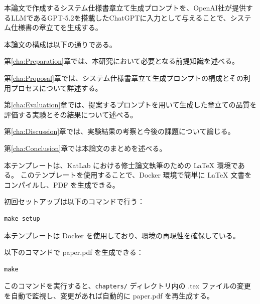 本論文で作成するシステム仕様書章立て生成プロンプトを、OpenAI\cite{openai}社が提供するLLMであるGPT-5.2\cite{gpt52}を搭載したChatGPT\cite{chatgpt}に入力として与えることで、システム仕様書の章立てを生成する。


本論文の構成は以下の通りである。

第\ref{cha:Preparation}章では、本研究において必要となる前提知識を述べる。

第\ref{cha:Proposal}章では、システム仕様書章立て生成プロンプトの構成とその利用プロセスについて詳述する。


第\ref{cha:Evaluation}章では、提案するプロンプトを用いて生成した章立ての品質を評価する実験とその結果について述べる。

第\ref{cha:Discussion}章では、実験結果の考察と今後の課題について論じる。

第\ref{cha:Conclusion}章では本論文のまとめを述べる。

\iffalse
本テンプレートは、KatLab における修士論文執筆のための LaTeX 環境である。
このテンプレートを使用することで、Docker 環境で簡単に LaTeX 文書をコンパイルし、PDF を生成できる。


初回セットアップは以下のコマンドで行う：
\begin{verbatim}
make setup
\end{verbatim}

本テンプレートは Docker を使用しており、環境の再現性を確保している\cite{kimura-docker}。

以下のコマンドで paper.pdf を生成できる：
\begin{verbatim}
make
\end{verbatim}

このコマンドを実行すると、\verb|chapters/| ディレクトリ内の .tex ファイルの変更を自動で監視し、変更があれば自動的に paper.pdf を再生成する。

